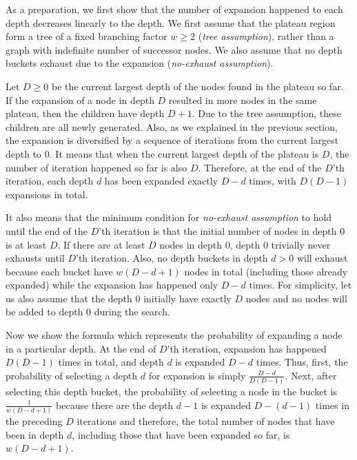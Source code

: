 
As a preparation, we first show that the number of expansion happened to each depth decreases
linearly to the depth.
% 
We first assume that the plateau region form a tree of a fixed branching factor
$w\geq 2$ (\emph{tree assumption}), rather than a graph with indefinite number of successor nodes.
We also assume that no depth buckets exhaust due to the expansion (\emph{no-exhaust assumption}).

Let $D\geq 0$ be the current largest depth of the nodes found in the plateau so far.  If the expansion of a node in
depth $D$ resulted in more nodes in the same plateau, then the children have depth $D+1$.  Due to the tree
assumption, these children are all newly generated. Also, as we explained in the previous section, the expansion is
diversified by a sequence of iterations from the current largest depth to 0.  It means that when the current
largest depth of the plateau is $D$, the number of iteration happened so far is also $D$.
Therefore, at the end of the $D$'th iteration, each depth $d$ has been expanded exactly $D-d$ times, with $D(D-1)$
expansions in total.

It also means that the minimum condition for \emph{no-exhaust assumption} to hold until the end of the $D$'th
iteration is that the initial number of nodes in depth 0 is at least $D$.  If there are at least $D$ nodes in depth
0, depth 0 trivially never exhausts until $D$'th iteration. Also, no depth buckets in depth $d>0$ will exhaust
because each bucket have $w(D-d+1)$ nodes in total (including those already expanded) while the expansion has
happened only $D-d$ times. For simplicity, let us also assume that the depth 0 initially have exactly $D$ nodes and
no nodes will be added to depth 0 during the search.

Now we show the formula which represents the probability of expanding a node in a particular depth.
At the end of $D$'th iteration,
expansion has happened $D(D-1)$ times in total, and depth $d$ is expanded $D-d$ times.
Thus, first, the probability of selecting a depth $d$ for expansion is simply $\frac{D-d}{D(D-1)}$.
Next, after selecting this depth bucket, the probability of selecting a node in the bucket is $\frac{1}{w(D-d+1)}$ because there are 
the depth $d-1$ is expanded $D-(d-1)$ times in the preceding $D$ iterations
and therefore, the total number of nodes that have been in depth $d$, including those that have been expanded so far, is $w(D-d+1)$.


